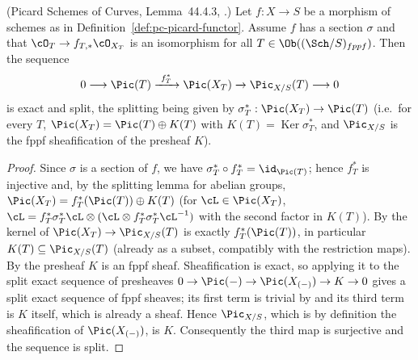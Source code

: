 \begin{theorem}
\label{thm:pc-pic-split}
(Picard Schemes of Curves, Lemma~44.4.3,
.)
Let $f:X\to S$ be a morphism of schemes as in
Definition~\ref{def:pc-picard-functor}.
Assume $f$ has a section $\sigma$ and that
$\cO_T\to f_{T,*}\cO_{X_T}$ is an isomorphism for all
$T\in\Ob((\Sch/S)_{fppf})$.  Then the sequence
\[
0\longrightarrow\Pic(T)\xrightarrow{\ f_T^*\ }\Pic(X_T)
\xrightarrow{\ }\Pic_{X/S}(T)\longrightarrow 0
\]
is exact and split, the splitting being given by
$\sigma_T^*:\Pic(X_T)\to\Pic(T)$ (i.e.\ for every $T$,
$\Pic(X_T)=\Pic(T)\oplus K(T)$ with
$K(T)=\operatorname{Ker}\sigma_T^*$, and $\Pic_{X/S}$ is the fppf
sheafification of the presheaf $K$).
\end{theorem}
\begin{proof}
Since $\sigma$ is a section of $f$, we have
$\sigma_T^*\circ f_T^*=\id_{\Pic(T)}$; hence $f_T^*$ is injective and, by
the splitting lemma for abelian groups,
$\Pic(X_T)=f_T^*(\Pic(T))\oplus K(T)$ (for $\cL\in\Pic(X_T)$,
$\cL=f_T^*\sigma_T^*\cL\otimes(\cL\otimes f_T^*\sigma_T^*\cL^{-1})$ with
the second factor in $K(T)$).  By  the kernel of
$\Pic(X_T)\to\Pic_{X/S}(T)$ is exactly $f_T^*(\Pic(T))$, in particular
$K(T)\subseteq\Pic_{X/S}(T)$ (already as a subset, compatibly with the
restriction maps).  By  the presheaf $K$ is an fppf
sheaf.  Sheafification is exact, so applying it to the split exact
sequence of presheaves
$0\to\Pic(-)\to\Pic(X_{(-)})\to K\to0$ gives a split exact sequence of
fppf sheaves; its first term is trivial by
 and its third term is $K$ itself,
which is already a sheaf.  Hence $\Pic_{X/S}$, which is by definition
the sheafification of $\Pic(X_{(-)})$, is $K$.
Consequently the third map is surjective and the sequence is split.
\end{proof}

